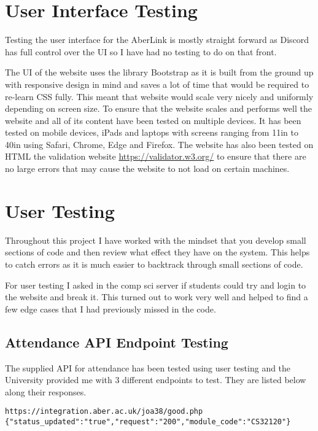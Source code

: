 \section{User Interface Testing}
Testing the user interface for the AberLink is mostly straight forward as Discord has full control over the UI so I have had no testing to do on that front.

The UI of the website uses the library Bootstrap \cite{bootstrap} as it is built from the ground up with responsive design in mind and saves a lot of time that would be required to re-learn CSS fully. This meant that website would scale very nicely and uniformly depending on screen size. To ensure that the website scales and performs well the website and all of its content have been tested on multiple devices. It has been tested on mobile devices, iPads and laptops with screens ranging from 11in to 40in using Safari, Chrome, Edge and Firefox. The website has also been tested on HTML the validation website \href{https://validator.w3.org/}{https://validator.w3.org/} to ensure that there are no large errors that may cause the website to not load on certain machines.

\section{User Testing}\label{sec4:user-tesing}
Throughout this project I have worked with the mindset that you develop small sections of code and then review what effect they have on the system. This helps to catch errors as it is much easier to backtrack through small sections of code.

For user testing I asked in the comp sci server if students could try and login to the website and break it. This turned out to work very well and helped to find a few edge cases that I had previously missed in the code.

\subsection{Attendance API Endpoint Testing}
The supplied API for attendance has been tested using user testing and the University provided me with 3 different endpoints to test. They are listed below along their responses.

\begin{verbatim}
https://integration.aber.ac.uk/joa38/good.php
{"status_updated":"true","request":"200","module_code":"CS32120"}    
\end{verbatim}

